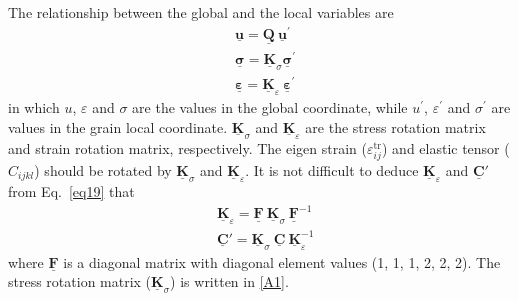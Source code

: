 \documentclass[reprint,3p,sort&compress,times,onecolumn]{elsarticle}
\begin{document}
The relationship between the global and the local variables are
\begin{equation}
\begin{split}
& \underline{\mathbf{u}}= \underline{\mathbf{Q}}~\underline{\mathbf{u}}^\prime \\
& \underline{\boldsymbol{\sigma}} = \underline{\mathbf{K}}_{\sigma} \underline{\boldsymbol{\sigma}}^\prime  \\
& \underline{\boldsymbol{\varepsilon}} = \underline{\mathbf{K}}_{\varepsilon}~\underline{\boldsymbol{\varepsilon}}^\prime  \label{eq19}
\end{split}
\end{equation}
in which $u$, $\varepsilon$ and $\sigma$ are the values in the global coordinate, while $u^\prime$, $\varepsilon^\prime$ and $\sigma^\prime$ are values in the grain local coordinate. $\underline{\mathbf{K}}_{\sigma}$ and $\underline{\mathbf{K}}_{\varepsilon}$ are the stress rotation matrix and strain rotation matrix, respectively.
The eigen strain ($\varepsilon^{\text{tr}}_{ij}$) and elastic tensor ($C_{ijkl}$) should be rotated by $\underline{\mathbf{K}}_{\sigma}$ and $\underline{\mathbf{K}}_{\varepsilon}$. It is not difficult to deduce $\underline{\mathbf{K}}_{\varepsilon}$ and $\underline{\mathbf{C}}'$ from Eq.~\ref{eq19}  that
\begin{equation}
\begin{split}
& \underline{\mathbf{K}}_{\varepsilon} = \underline{\mathbf{F}}~ \underline{\mathbf{K}}_{\sigma}~\underline{\mathbf{F}}^{-1} \\
& \underline{\mathbf{C}}' = \underline{\mathbf{K}}_{\sigma}~\underline{\mathbf{C}}~ \underline{\mathbf{K}}_{\varepsilon}^{-1}
\end{split}
\end{equation}
where $\underline{\mathbf{F}}$ is a diagonal matrix with diagonal element values (1, 1, 1, 2, 2, 2). The stress rotation matrix ($\underline{\mathbf{K}}_{\sigma}$) is written in \ref{A1}. 
\end{document}
